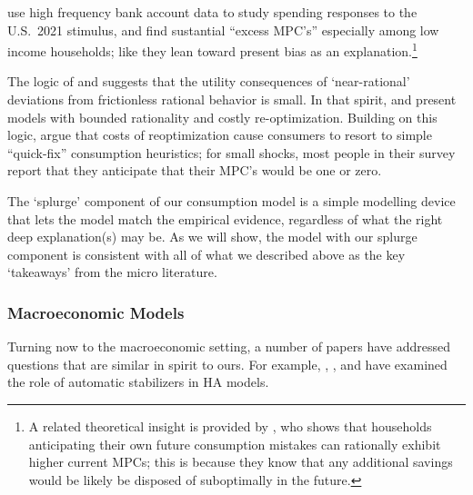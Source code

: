 \documentclass[\econtexRoot/HAFiscal]{subfiles}
\begin{document}

\cite{indarte2024explains} use high frequency bank account data to study spending responses to the U.S.\ 2021 stimulus, and find sustantial ``excess MPC's'' especially among low income households; like \cite{lmmPresentBias} they lean toward present bias as an explanation.\footnote{A related theoretical insight is provided by \citet{Lian2023-ca}, who shows that households anticipating their own future consumption mistakes can rationally exhibit higher current MPCs; this is because they know that any additional savings would be likely be disposed of suboptimally in the future.}

The logic of \cite{akerlof1985near} and \cite{cochrane1989sensitivity} suggests that the utility consequences of `near-rational' deviations from frictionless rational behavior is small.
In that spirit, \cite{BoutrosWindfall} and \cite{ilutEconomic} present models with bounded rationality and costly re-optimization.  Building on this logic, \cite{ansQuickfix} argue that costs of reoptimization cause consumers to resort to simple ``quick-fix'' consumption heuristics; for small shocks, most people in their survey report that they anticipate that their MPC's would be one or zero.

The `splurge' component of our consumption model is a simple modelling device that lets the model match the empirical evidence, regardless of what the right deep explanation(s) may be. As we will show, the model with our splurge component is consistent with all of what we described above as the key `takeaways' from the micro literature. 

\hypertarget{macroeconomic-models}{}
\subsubsection{Macroeconomic Models}
Turning now to the macroeconomic setting, a number of papers have addressed questions that are similar in spirit to ours.  For example, \cite{mckay2016role}, \cite{mckay2021optimal}, and \cite{phan2024welfare} have examined the role of automatic stabilizers in HA models.
\end{document}
